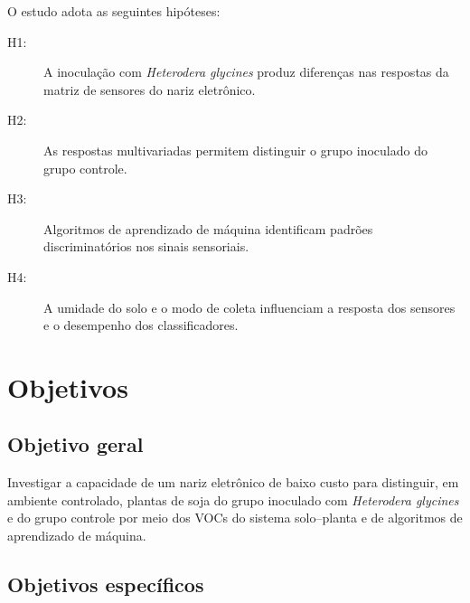 O estudo adota as seguintes hipóteses:

\begin{description}
    \item[H1:] A inoculação com \textit{Heterodera glycines} produz diferenças nas respostas da matriz de sensores do nariz eletrônico.

    \item[H2:] As respostas multivariadas permitem distinguir o grupo inoculado do grupo controle.

    \item[H3:] Algoritmos de aprendizado de máquina identificam padrões discriminatórios nos sinais sensoriais.

    \item[H4:] A umidade do solo e o modo de coleta influenciam a resposta dos sensores e o desempenho dos classificadores.
\end{description}

\section{Objetivos}

\subsection{Objetivo geral}

Investigar a capacidade de um nariz eletrônico de baixo custo para distinguir, em ambiente controlado, plantas de soja do grupo inoculado com \textit{Heterodera glycines} e do grupo controle por meio dos VOCs do sistema solo--planta e de algoritmos de aprendizado de máquina.

\subsection{Objetivos específicos}


